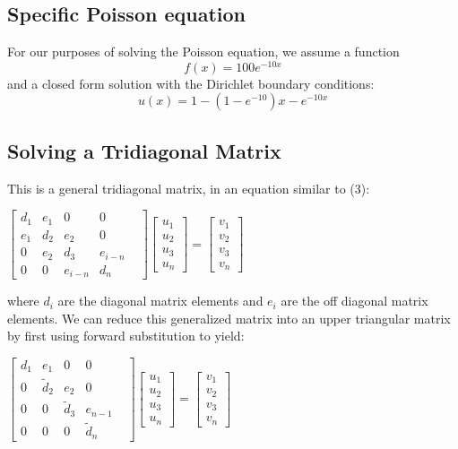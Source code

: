 \documentclass[10pt,showpacs,preprintnumbers,footinbib,amsmath,amssymb,aps,prl,twocolumn,groupedaddress,superscriptaddress,showkeys]{revtex4-1}
\begin{document}
	\subsection{Specific Poisson equation}	
For our purposes of solving the Poisson equation, we assume a function \begin{equation}
	f(x)=100e^{-10x}
	\end{equation}
and a closed form solution with the Dirichlet boundary conditions:
	\begin{equation}
	u(x)=1-(1-e^{-10})x-e^{-10x}
	\end{equation}
	\subsection{Solving a Tridiagonal Matrix}
This is a general tridiagonal matrix, in an equation similar to (3):
	\begin{center}
		$\begin{bmatrix}
			d_{1}& e_{1} & 0 & 0 \\
			e_{1} & d_{2} & e_{2} & 0 & \\
			0 & e_{2} & d_{3} & e_{i-n}   \\
			0 & 0 & e_{i-n} & d_{n} 
	
		\end{bmatrix}
		 \begin{bmatrix}
			u_{1} \\
			u_{2} \\
			u_{3} \\
			u_{n} 
		\end{bmatrix} =
		\begin{bmatrix}
			v_{1} \\
			v_{2} \\
			v_{3} \\
			v_{n}
		\end{bmatrix}$
		\end{center}

where $d_{i}$ are the diagonal matrix elements and $e_{i}$ are the off diagonal matrix elements. We can reduce this generalized matrix into an upper triangular matrix by first using forward substitution to yield:
	
\begin{center}
		$\begin{bmatrix}
			d_{1}& e_{1} & 0 & 0 \\
			0 & \tilde{d}_{2} & e_{2} & 0 & \\
			0 & 0 & \tilde{d}_{3} & e_{n-1}   \\
			0 & 0 & 0 & \tilde{d}_{n} 
	
		\end{bmatrix}
		 \begin{bmatrix}
			u_{1} \\
			u_{2} \\
			u_{3} \\
			u_{n} 
		\end{bmatrix} =
		\begin{bmatrix}
			v_{1} \\
			v_{2} \\
			v_{3} \\
			v_{n}
		\end{bmatrix}$
		\end{center}
\end{document}
